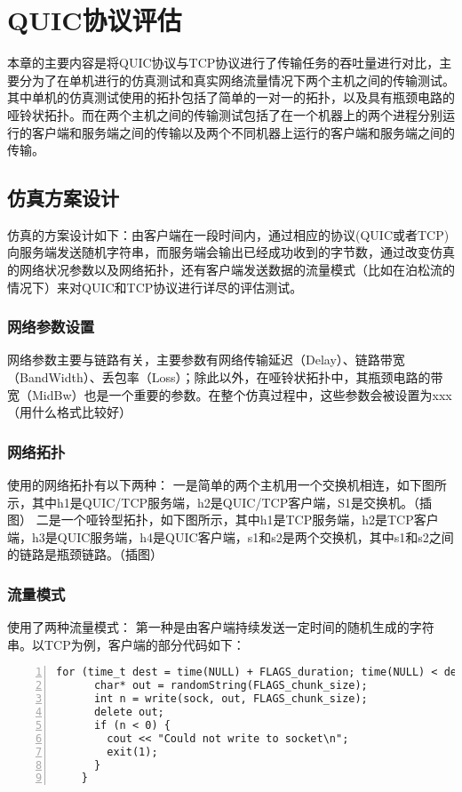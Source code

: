 \chapter{QUIC协议评估}
本章的主要内容是将QUIC协议与TCP协议进行了传输任务的吞吐量进行对比，主要分为了在单机进行的仿真测试和真实网络流量情况下两个主机之间的传输测试。其中单机的仿真测试使用的拓扑包括了简单的一对一的拓扑，以及具有瓶颈电路的哑铃状拓扑。而在两个主机之间的传输测试包括了在一个机器上的两个进程分别运行的客户端和服务端之间的传输以及两个不同机器上运行的客户端和服务端之间的传输。

\section{仿真方案设计}
仿真的方案设计如下：由客户端在一段时间内，通过相应的协议(QUIC或者TCP)向服务端发送随机字符串，而服务端会输出已经成功收到的字节数，通过改变仿真的网络状况参数以及网络拓扑，还有客户端发送数据的流量模式（比如在泊松流的情况下）来对QUIC和TCP协议进行详尽的评估测试。
\subsection{网络参数设置}
网络参数主要与链路有关，主要参数有网络传输延迟（Delay）、链路带宽（BandWidth）、丢包率（Loss）；除此以外，在哑铃状拓扑中，其瓶颈电路的带宽（MidBw）也是一个重要的参数。在整个仿真过程中，这些参数会被设置为xxx（用什么格式比较好）

\subsection{网络拓扑}
使用的网络拓扑有以下两种：
一是简单的两个主机用一个交换机相连，如下图所示，其中h1是QUIC/TCP服务端，h2是QUIC/TCP客户端，S1是交换机。（插图）
二是一个哑铃型拓扑，如下图所示，其中h1是TCP服务端，h2是TCP客户端，h3是QUIC服务端，h4是QUIC客户端，s1和s2是两个交换机，其中s1和s2之间的链路是瓶颈链路。（插图）

\subsection{流量模式}
使用了两种流量模式：
第一种是由客户端持续发送一定时间的随机生成的字符串。以TCP为例，客户端的部分代码如下：

\begin{lstlisting}[language={[ANSI]C},numbers=left]
	for (time_t dest = time(NULL) + FLAGS_duration; time(NULL) < dest; ) {
      char* out = randomString(FLAGS_chunk_size);
      int n = write(sock, out, FLAGS_chunk_size);
      delete out;
      if (n < 0) {
        cout << "Could not write to socket\n";
        exit(1);
      }
    }
\end{lstlisting}


